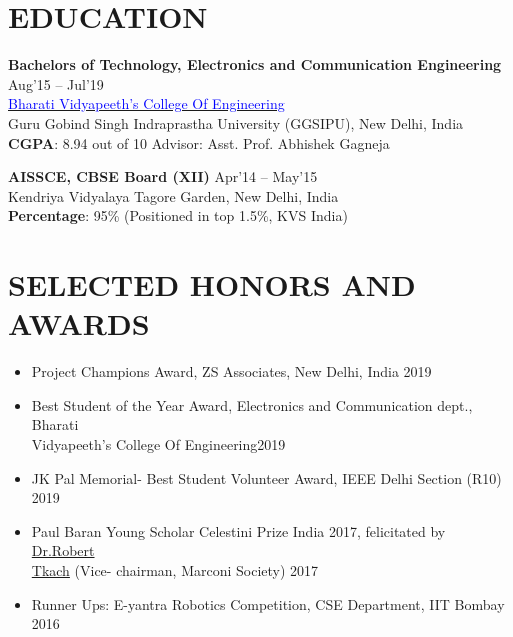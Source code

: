 \documentclass[11pt]{res} %
\newcommand{\titlegap}{5pt} %
\newcommand{\sectgap}{0.05in} %
\begin{document}
\begin{resume}
\vspace{\sectgap}
\hline
\section{EDUCATION} %

\vspace{\titlegap}

{\bf Bachelors of Technology, Electronics and Communication Engineering} \hfill Aug'15 -- Jul'19 \\ 
\href{http://bvcoend.ac.in}{\textcolor{blue}{Bharati Vidyapeeth's College Of Engineering}}\\
Guru Gobind Singh Indraprastha University (GGSIPU), New Delhi, India \\
\textbf{CGPA}: 8.94 out of 10 \hspace{0.2in}
Advisor: Asst. Prof. Abhishek Gagneja

{\bf AISSCE, CBSE Board (XII)} \hfill Apr'14 -- May'15 \\ 
Kendriya Vidyalaya Tagore Garden, New Delhi, India\\
\textbf{Percentage}: 95\% (Positioned in top 1.5\%, KVS India)

\vspace{\sectgap}
\hline
\section{SELECTED HONORS AND AWARDS}

\vspace{0.2in} 

\begin{itemize}
    \item Project Champions Award, ZS Associates, New Delhi, India \hfill 2019
    \item Best Student of the Year Award, Electronics and Communication dept., Bharati \\
    Vidyapeeth's College Of Engineering\hfill 2019
    \item{}JK Pal Memorial- Best Student Volunteer Award, IEEE Delhi Section (R10) \hfill 2019
    \item Paul Baran Young Scholar Celestini Prize India 2017, felicitated by \href{https://marconisociety.org/about/board-of-directors/robert-tkach-2/}{Dr.Robert\\
    Tkach} (Vice-
    chairman, Marconi Society) \hfill 2017
    \item Runner Ups: E-yantra Robotics Competition, CSE Department, IIT Bombay \hfill 2016
\end{itemize}


\end{resume}
\end{document}
